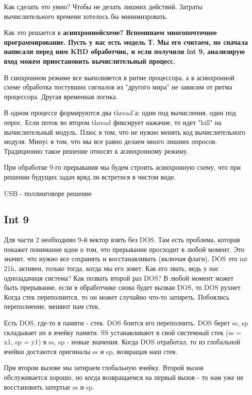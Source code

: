 Как сделать это умно? Чтобы не делать лишних действий. Затраты вычислительного времени хотелось бы минимизровать.

Как это решается в \bfseries асинхронной\mdseries схеме? Вспоминаем многопочточное программирование. Пусть у нас есть модель Т. Мы его считаем, но сначала написали перед ним KBD обработчик, и если получили int 9, анализирую вход  можем приостановить вычислительный процесс.

В синхронном режиме все выполняется в ритме процессора, а в асинхронной схеме обработка постувших сигналов из "другого мира" не зависим от ритма процессора. Другая временная логика. 

В одном процессе формируются два thread'а: один под вычисления, один под опрос. Если поток во втором thread фиксирует нажачие, то идет "kill" на вычислительный модуль. Плюс в том, что не нужно менять код вычислительного модуля. Минус в том, что мы все равно делаем много лишних опросов. Традиционно такое решение относят к асинхронному режиму. 

При обработке 9-го прерывания мы будем строить асинхронную схему, что при решении будущих задач вряд ли встретися в чистом виде. 

\begin{off} USB - поллинговоре решение \end{off}

\subsection{Int 9}
Для части 2 необходимо 9-й вектор взять без DOS. Там есть проблема, которая покажет понимание идеи о том, что прерывание просходит в любой момент. Это значит, что нужно все сохранять и восстанавливать (включая флаги).  DOS это int 21h, активен, только тогда, когда мы его зовет. Как его звать, ведь у нас однозадачная система? Как позвать второй раз DOS? В любой момент может быть прерывание, если в обработчике снова будет вызван DOS, то DOS рухнет. Когда стек переполнится, то он может случайно что-то затиреть. Побоялись переполнение, меняют нам стек.

Есть DOS, где-то в памяти - стек. DOS боится его переполнить. DOS берет ss, sp складывает их в ячейку памяти. SS устанавливают в свой системный стек (ss = x1, sp = y1) в ss, sp - новые значения. Когда DOS отработал, то из глобальной ячейки достаются оригиналы ss и sp, возвращая наш стек.

При втором вызове мы затираем глобальную ячейку. Второй вызов обслуживается хорошо, но когда возвращаемся на первый вызов - то нам уже не восстановить затертые ss и sp.

